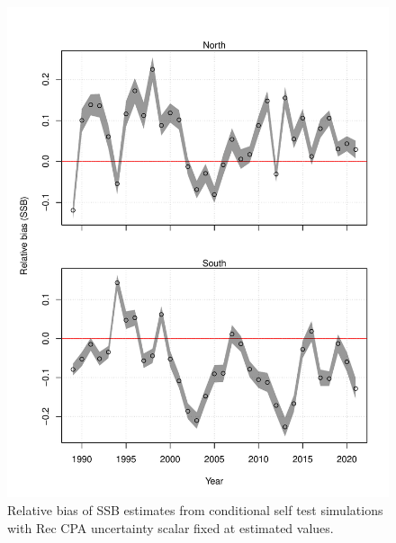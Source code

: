 \documentclass[
]{article}
\begin{document}
\begin{figure}

{\centering \includegraphics{bsb_models_wp_files/figure-latex/self-test-res-3-1} 

}

\caption{Relative bias of SSB estimates from conditional self test simulations with Rec CPA uncertainty scalar fixed at estimated values.}\label{fig:self-test-res-3}
\end{figure}
\end{document}
